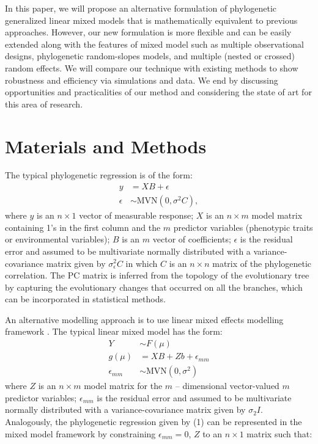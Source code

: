 In this paper, we will propose an alternative formulation of phylogenetic generalized linear mixed models that is mathematically equivalent to previous approaches.
However, our new formulation is more flexible and can be easily extended along with the features of mixed model such as multiple observational designs, phylogenetic random-slopes models, and multiple (nested or crossed) random effects.
We will compare our technique with existing methods to show robustness and efficiency via simulations and data.
We end by discussing opportunities and practicalities of our method and considering the state of art for this area of research. 

\section{Materials and Methods}

The typical phylogenetic regression is of the form:
\begin{align}
y & = XB + \epsilon \label{eq:gls1} \\ 
\epsilon & \sim \textrm{MVN}(0,\sigma^{2}C), \label{eq:gls2}
\end{align}
where $y$ is an $n \times 1$ vector of measurable response; $X$ is an $n \times m$ model matrix containing 1's in the first column and the $m$ predictor variables (phenotypic traits or environmental variables); $B$ is an $m$ vector of coefficients; $\epsilon$ is the residual error and assumed to be multivariate normally distributed with a variance-covariance matrix given by $\sigma^{2}_{\epsilon}C$ in which $C$ is an $n \times n$ matrix of the phylogenetic correlation.
The PC matrix is inferred from the topology of the evolutionary tree by capturing the evolutionary changes that occurred on all the branches, which can be incorporated in statistical methods.

An alternative modelling approach is to use linear mixed effects modelling framework \citep{lynch1991methods}.
The typical linear mixed model has the form:
\begin{align}
Y & \sim F(\mu) \label{eq:glmm1} \\
g(\mu) & = XB + Zb + \epsilon_{mm} \label{eq:glmm2} \\
\epsilon_{mm} & \sim \textrm{MVN}(0,\sigma^2) \label{eq:glmm3}
\end{align}
where $Z$ is an $n \times m$ model matrix for the $m$ -- dimensional vector-valued $m$ predictor variables; $\epsilon_{mm}$ is the residual error and assumed to be multivariate normally distributed with a variance-covariance matrix given by $\sigma_{2}I$.
Analogously, the phylogenetic regression given by (1) can be represented in the mixed model framework by constraining $\epsilon_{mm} = 0$, $Z$ to an $n \times 1$ matrix such that: 

